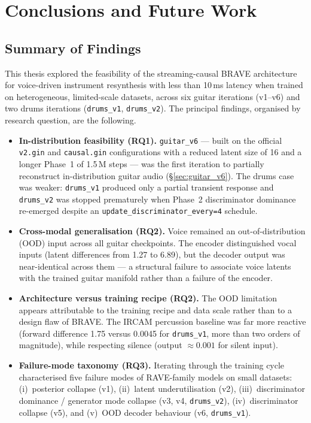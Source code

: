 \documentclass[a4paper,11pt,oneside,openany]{book}
\begin{document}
\chapter{Conclusions and Future Work}\label{chap:conclusions}

\section{Summary of Findings}\label{sec:summary_findings}

This thesis explored the feasibility of the streaming-causal BRAVE architecture for voice-driven instrument resynthesis with less than 10\,ms latency when trained on heterogeneous, limited-scale datasets, across six guitar iterations (v1--v6) and two drums iterations (\texttt{drums\_v1}, \texttt{drums\_v2}). The principal findings, organised by research question, are the following.

\begin{itemize}
\item \textbf{In-distribution feasibility (RQ1).} \texttt{guitar\_v6} --- built on the official \texttt{v2.gin} and \texttt{causal.gin} configurations with a reduced latent size of 16 and a longer Phase~1 of 1.5\,M steps --- was the first iteration to partially reconstruct in-distribution guitar audio (\S\ref{sec:guitar_v6}). The drums case was weaker: \texttt{drums\_v1} produced only a partial transient response and \texttt{drums\_v2} was stopped prematurely when Phase~2 discriminator dominance re-emerged despite an \texttt{update\_discriminator\_every=4} schedule.
\item \textbf{Cross-modal generalisation (RQ2).} Voice remained an out-of-distribution (OOD) input across all guitar checkpoints. The encoder distinguished vocal inputs (latent differences from 1.27 to 6.89), but the decoder output was near-identical across them --- a structural failure to associate voice latents with the trained guitar manifold rather than a failure of the encoder.
\item \textbf{Architecture versus training recipe (RQ2).} The OOD limitation appears attributable to the training recipe and data scale rather than to a design flaw of BRAVE. The IRCAM percussion baseline was far more reactive (forward difference 1.75 versus 0.0045 for \texttt{drums\_v1}, more than two orders of magnitude), while respecting silence (output $\approx 0.001$ for silent input).
\item \textbf{Failure-mode taxonomy (RQ3).} Iterating through the training cycle characterised five failure modes of RAVE-family models on small datasets: (i)~posterior collapse (v1), (ii)~latent underutilisation (v2), (iii)~discriminator dominance / generator mode collapse (v3, v4, \texttt{drums\_v2}), (iv)~discriminator collapse (v5), and (v)~OOD decoder behaviour (v6, \texttt{drums\_v1}).
\end{itemize}
\end{document}
